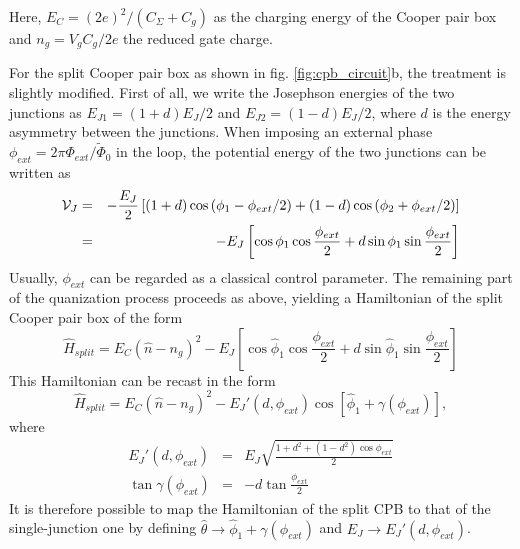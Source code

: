 Here, $E_C = (2e)^2 / (C_\Sigma+C_g)$ as the charging energy of the Cooper pair box and $n_g=V_g C_g /2e $ the reduced gate charge.

\smallskip

For the split Cooper pair box as shown in fig. \ref{fig:cpb_circuit}b, the treatment is slightly modified. First of all, we write the Josephson energies of the two junctions as $E_{J1}=(1+d)E_J/2$ and $E_{J2}=(1-d)E_J/2$, where $d$ is the energy asymmetry between the junctions. When imposing an external phase $\phi_{ext}=2\pi\Phi_{ext}/\tilde{\Phi}_0$ in the loop, the potential energy of the two junctions can be written as
%
\begin{eqnarray}
\begin{mathcal}V\end{mathcal}_J & = & -\frac{E_J}{2}\left[(1+d)\cos{(\phi_1-\phi_{ext}/2)}+(1-d)\cos{(\phi_2+\phi_{ext}/2)} \right] \\
& = & -E_J\left[\cos{\phi_1}\cos{\frac{\phi_{ext}}{2}}+d\sin{\phi_1}\sin{\frac{\phi_{ext}}{2}}\right]
\end{eqnarray}
%
Usually, $\phi_{ext}$ can be regarded as a classical control parameter. The remaining part of the quanization process proceeds as above, yielding a Hamiltonian of the split Cooper pair box of the form
%
\begin{equation}
\hat{H}_{split} = E_C(\hat{n}-n_g)^2-E_J\left[\cos{\hat{\phi}_1}\cos{\frac{\phi_{ext}}{2}}+d\sin{\hat{\phi}_1}\sin{\frac{\phi_{ext}}{2}}\right]
\end{equation}
%
This Hamiltonian can be recast in the form \citep{cottet_implementation_2002}
%
\begin{equation}
\hat{H}_{split} = E_C(\hat{n}-n_g)^2-E_J'(d,\phi_{ext})\cos{[\hat{\phi}_1+\gamma(\phi_{ext})]},
\end{equation}
%
where
%
\begin{eqnarray}
E_J'(d,\phi_{ext}) & = & E_J\sqrt{\frac{1+d^2+(1-d^2)\cos{\phi_{ext}}}{2}} \\
\tan{\gamma(\phi_{ext})} & = & -d\tan{\frac{\phi_{ext}}{2}}
\end{eqnarray}
%
It is therefore possible to map the Hamiltonian of the split CPB to that of the single-junction one by defining $\hat{\theta}\to\hat{\phi}_1+\gamma(\phi_{ext})$ and $E_J\to E_J'(d,\phi_{ext})$. 

